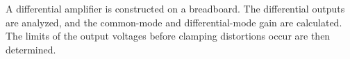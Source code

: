 A differential amplifier is constructed on a breadboard.
The differential outputs are analyzed, and the common-mode and differential-mode gain are calculated.
The limits of the output voltages before clamping distortions occur are then determined.

